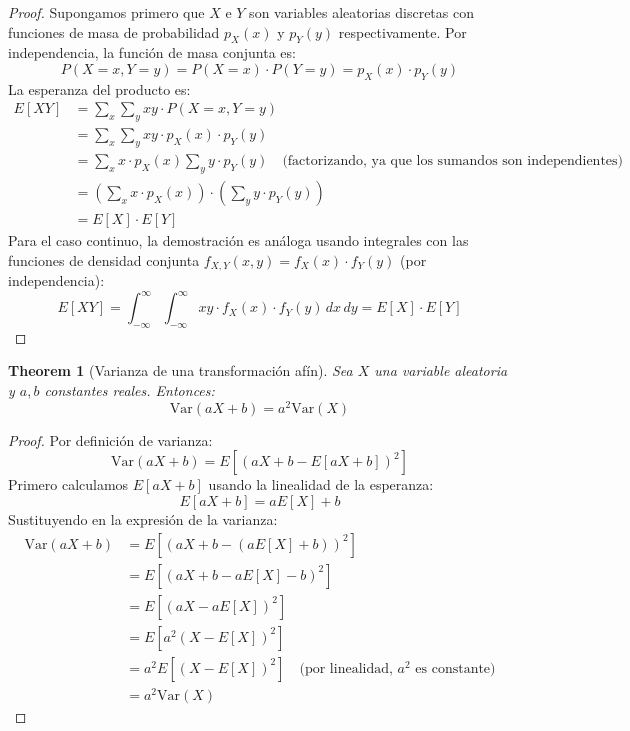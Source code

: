 \documentclass[11pt,a4paper]{article}
\theoremstyle{plain}
\newtheorem{theorem}{Theorem}[section]
\theoremstyle{definition}
\begin{document}
\begin{proof}
Supongamos primero que $X$ e $Y$ son variables aleatorias discretas con funciones de masa de probabilidad $p_X(x)$ y $p_Y(y)$ respectivamente. Por independencia, la función de masa conjunta es:
\[
P(X = x, Y = y) = P(X = x) \cdot P(Y = y) = p_X(x) \cdot p_Y(y)
\]
La esperanza del producto es:
\begin{align*}
E[XY] &= \sum_{x}\sum_{y} xy \cdot P(X = x, Y = y) \\
&= \sum_{x}\sum_{y} xy \cdot p_X(x) \cdot p_Y(y) \\
&= \sum_{x} x \cdot p_X(x) \sum_{y} y \cdot p_Y(y) \quad \text{(factorizando, ya que los sumandos son independientes)} \\
&= \left(\sum_{x} x \cdot p_X(x)\right) \cdot \left(\sum_{y} y \cdot p_Y(y)\right) \\
&= E[X] \cdot E[Y]
\end{align*}
Para el caso continuo, la demostración es análoga usando integrales con las funciones de densidad conjunta $f_{X,Y}(x,y) = f_X(x) \cdot f_Y(y)$ (por independencia):
\[
E[XY] = \int_{-\infty}^{\infty}\int_{-\infty}^{\infty} xy \cdot f_X(x) \cdot f_Y(y) \, dx \, dy = E[X] \cdot E[Y]
\]
\end{proof}

\begin{theorem}[Varianza de una transformación afín]
Sea $X$ una variable aleatoria y $a, b$ constantes reales. Entonces:
\[
\text{Var}(aX + b) = a^2\text{Var}(X)
\]
\end{theorem}

\begin{proof}
Por definición de varianza:
\[
\text{Var}(aX + b) = E\left[(aX + b - E[aX + b])^2\right]
\]
Primero calculamos $E[aX + b]$ usando la linealidad de la esperanza:
\[
E[aX + b] = aE[X] + b
\]
Sustituyendo en la expresión de la varianza:
\begin{align*}
\text{Var}(aX + b) &= E\left[(aX + b - (aE[X] + b))^2\right] \\
&= E\left[(aX + b - aE[X] - b)^2\right] \\
&= E\left[(aX - aE[X])^2\right] \\
&= E\left[a^2(X - E[X])^2\right] \\
&= a^2 E\left[(X - E[X])^2\right] \quad \text{(por linealidad, $a^2$ es constante)} \\
&= a^2 \text{Var}(X)
\end{align*}
\end{proof}
\end{document}
